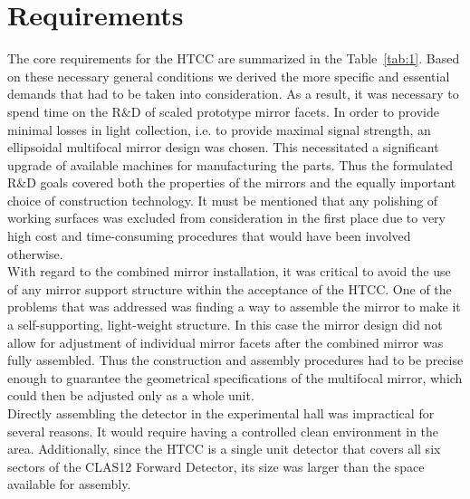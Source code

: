 \section{Requirements}

The core requirements for the HTCC are summarized in the Table~\ref{tab:1}. Based on these necessary general
conditions we derived the more specific and essential demands that had to be taken into consideration. As a result,
it was necessary to spend time on the R$\&$D of scaled prototype mirror facets. In order to provide minimal losses
in light collection, i.e. to provide maximal signal strength, an ellipsoidal multifocal mirror design was chosen. This
necessitated a significant upgrade of available machines for manufacturing the parts. Thus the formulated R$\&$D
goals covered both the properties of the mirrors and the equally important choice of construction technology. It must
be mentioned that any polishing of working surfaces was excluded from consideration in the first place due to very
high cost and time-consuming procedures that would have been involved otherwise. \\
\indent With regard to the combined mirror installation, it was critical to avoid the use of any mirror support
structure within the acceptance of the HTCC. One of the problems that was addressed was finding a way to assemble
the mirror to make it a self-supporting, light-weight structure. In this case the mirror design did not allow for
adjustment of individual mirror facets after the combined mirror was fully assembled. Thus the construction and
assembly procedures had to be precise enough to guarantee the geometrical specifications of the multifocal mirror,
which could then be adjusted only as a whole unit. \\
\indent Directly assembling the detector in the experimental hall was impractical for several reasons. It would require
having a controlled clean environment in the area. Additionally, since the HTCC is a single unit detector that covers all
six sectors of the CLAS12 Forward Detector, its size was larger than the space available for assembly.%
 
